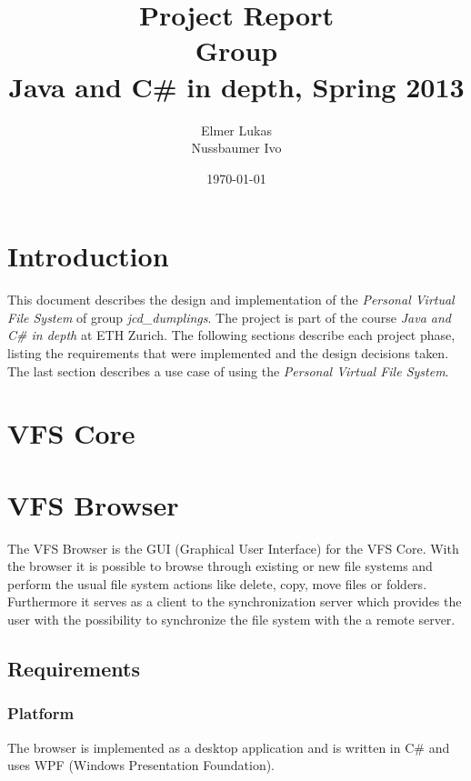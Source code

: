 \documentclass[a4paper,12pt]{article}
\title{
Project Report \\ 
Group \groupname \\
\vspace{5mm}
\large Java and C\# in depth, Spring 2013
}
\author{
Elmer Lukas \\
Nussbaumer Ivo
}
\date{\today}
\newcommand{\groupname}{jcd\_dumplings\xspace}
\begin{document}
\maketitle

\section{Introduction}

This document describes the design and implementation of the \emph{Personal Virtual File System} of group \emph{\groupname}. The project is part of the course \emph{Java and C\# in depth} at ETH Zurich. The following sections describe each project phase, listing the requirements that were implemented and the design decisions taken. The last section describes a use case of using the \emph{Personal Virtual File System}.


\section{VFS Core}




\section{VFS Browser}
The VFS Browser is the GUI (Graphical User Interface) for the VFS Core.
With the browser it is possible to browse through existing or new file systems and perform the usual file system actions like delete, copy, move files or folders. Furthermore it serves as a client to the synchronization server which provides the user with the possibility to synchronize the file system with the a remote server.


\subsection{Requirements}
\subsubsection{Platform}
The browser is implemented as a desktop application and is written in C\# and uses WPF (Windows Presentation Foundation).
\end{document}
